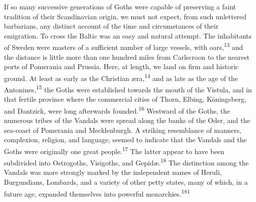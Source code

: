 If so many successive generations of Goths were capable of
preserving a faint tradition of their Scandinavian origin, we
must not expect, from such unlettered barbarians, any distinct
account of the time and circumstances of their emigration. To
cross the Baltic was an easy and natural attempt. The inhabitants
of Sweden were masters of a sufficient number of large vessels,
with oars,\textsuperscript{13} and the distance is little more than one hundred
miles from Carlscroon to the nearest ports of Pomerania and
Prussia. Here, at length, we land on firm and historic ground. At
least as early as the Christian æra,\textsuperscript{14} and as late as the age of
the Antonines,\textsuperscript{15} the Goths were established towards the mouth of
the Vistula, and in that fertile province where the commercial
cities of Thorn, Elbing, Köningsberg, and Dantzick, were long
afterwards founded.\textsuperscript{16} Westward of the Goths, the numerous tribes
of the Vandals were spread along the banks of the Oder, and the
sea-coast of Pomerania and Mecklenburgh. A striking resemblance
of manners, complexion, religion, and language, seemed to
indicate that the Vandals and the Goths were originally one great
people.\textsuperscript{17} The latter appear to have been subdivided into
Ostrogoths, Visigoths, and Gepidæ.\textsuperscript{18} The distinction among the
Vandals was more strongly marked by the independent names of
Heruli, Burgundians, Lombards, and a variety of other petty
states, many of which, in a future age, expanded themselves into
powerful monarchies.\textsuperscript{181}







